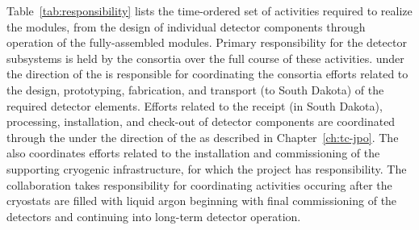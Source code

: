 Table~\ref{tab:responsibility} lists the time-ordered set of activities 
required to realize the   modules, from the design 
of individual detector components through operation of the fully-assembled 
modules.  Primary responsibility for the detector subsystems is held 
by the  consortia over the full course of these activities.
  under the direction of the  is 
responsible for coordinating the consortia efforts related to the design, 
prototyping, fabrication, and transport (to South Dakota) of the required 
detector elements.  Efforts related to the receipt (in South Dakota), 
processing, installation, and check-out of detector components are 
coordinated through the  under the direction of the  as 
described in Chapter~\ref{ch:tc-jpo}.  The  also coordinates efforts 
related to the installation and commissioning of the supporting cryogenic 
infrastructure, for which the  project has %
responsibility.  
The  collaboration takes responsibility for coordinating 
activities occuring after the cryostats are filled with liquid argon 
beginning with final commissioning of the detectors and continuing into 
long-term detector operation.
